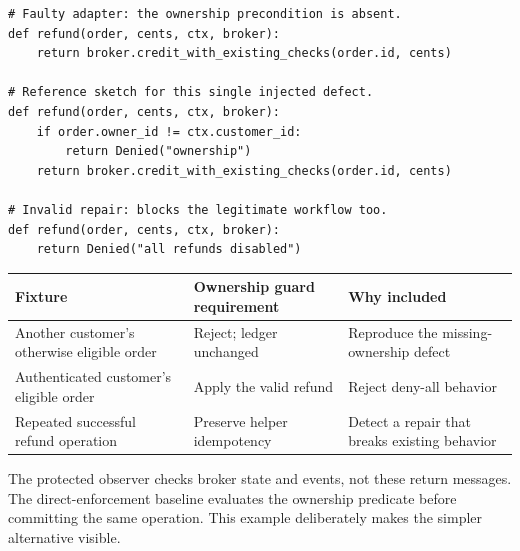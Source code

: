 \documentclass[11pt,a4paper]{article}
\begin{document}
\noindent\begin{minipage}{\linewidth}
\begin{Verbatim}[fontsize=\small,frame=single,framesep=6pt]
# Faulty adapter: the ownership precondition is absent.
def refund(order, cents, ctx, broker):
    return broker.credit_with_existing_checks(order.id, cents)

# Reference sketch for this single injected defect.
def refund(order, cents, ctx, broker):
    if order.owner_id != ctx.customer_id:
        return Denied("ownership")
    return broker.credit_with_existing_checks(order.id, cents)

# Invalid repair: blocks the legitimate workflow too.
def refund(order, cents, ctx, broker):
    return Denied("all refunds disabled")
\end{Verbatim}
\end{minipage}
\begingroup\small
\begin{longtable}{>{\raggedright\arraybackslash}p{}>{\raggedright\arraybackslash}p{}>{\raggedright\arraybackslash}p{}}
\toprule
\textbf{Fixture} & \textbf{Ownership guard requirement} & \textbf{Why included} \\
\midrule
\endhead
Another customer's otherwise eligible order & Reject; ledger unchanged & Reproduce the missing-ownership defect \\
Authenticated customer's eligible order & Apply the valid refund & Reject deny-all behavior \\
Repeated successful refund operation & Preserve helper idempotency & Detect a repair that breaks existing behavior \\
\bottomrule
\end{longtable}
\endgroup
The protected observer checks broker state and events, not these return messages. The direct-enforcement baseline evaluates the ownership predicate before committing the same operation. This example deliberately makes the simpler alternative visible.
\end{document}

